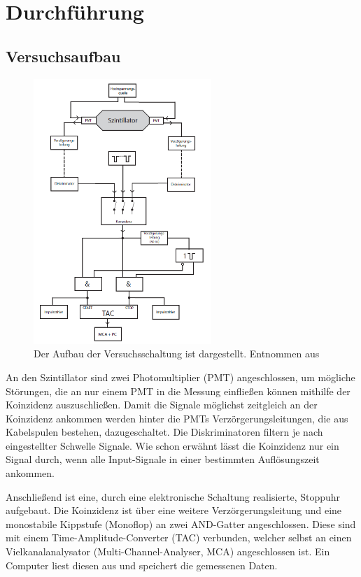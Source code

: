 \newpage
\section{Durchführung}
    \subsection{Versuchsaufbau}
        \begin{figure}[h]
          \centering
          \includegraphics[width = 0.6\textwidth]{pictures/Aufbau.png}
          \caption{Der Aufbau der Versuchsschaltung ist   dargestellt. Entnommen aus \cite{tu_dortmund_versuchsanleitung_2021-1}}
          \label{fig:Aufbau}
        \end{figure}

        \FloatBarrier

        An den Szintillator sind zwei Photomultiplier (PMT) angeschlossen, um mögliche Störungen, die an nur einem PMT in die Messung einfließen können mithilfe der Koinzidenz auszuschließen.
        Damit die Signale möglichst zeitgleich an der Koinzidenz ankommen werden hinter die PMTs Verzörgerungsleitungen, die aus Kabelspulen bestehen, dazugeschaltet.
        Die Diskriminatoren filtern je nach eingestellter Schwelle Signale.
        Wie schon erwähnt lässt die Koinzidenz nur ein Signal durch, wenn alle Input-Signale in einer bestimmten Auflösungszeit ankommen.

        Anschließend ist eine, durch eine elektronische Schaltung realisierte, Stoppuhr aufgebaut. Die Koinzidenz ist über eine weitere Verzörgerungsleitung und eine monostabile Kippstufe (Monoflop) an zwei AND-Gatter angeschlossen. Diese sind mit einem Time-Amplitude-Converter (TAC) verbunden, welcher selbst an einen Vielkanalanalysator (Multi-Channel-Analyser, MCA) angeschlossen ist. Ein Computer liest diesen aus und speichert die gemessenen Daten.

